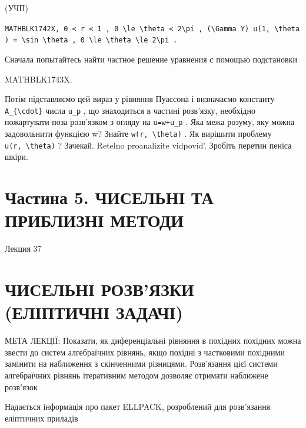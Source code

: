 \documentclass[
  ukrainian,
]{article}
\begin{document}
(УЧП)

\texttt{MATHBLK1742X,\ \textquotesingle{}0\ \textless{}\ r\ \textless{}\ 1\textquotesingle{}\ ,\ \textquotesingle{}0\ \textbackslash{}le\ \textbackslash{}theta\ \textless{}\ 2\textbackslash{}pi\textquotesingle{}\ ,\ \textquotesingle{}(\textbackslash{}Gamma\ Y)\textquotesingle{}\ \textquotesingle{}u(1,\ \textbackslash{}theta)\ =\ \textbackslash{}sin\ \textbackslash{}theta\textquotesingle{}\ ,\ \textquotesingle{}0\ \textbackslash{}le\ \textbackslash{}theta\ \textbackslash{}le\ 2\textbackslash{}pi\textquotesingle{}\ .}

Сначала попытайтесь найти частное решение уравнения с помощью
подстановки

MATHBLK1743X.

Потім підставляємо цей вираз у рівняння Пуассона і визначаємо константу
\texttt{A\_\{\textbackslash{}cdot\}} числа \texttt{u\_p} , що
знаходиться в частині розв'язку, необхідно пожартувати поза розв'язком з
огляду на \texttt{u=w+u\_p} . Яка межа розуму, яку можна задовольнити
функцією w? Знайте \texttt{w(r,\ \textbackslash{}theta)} . Як вирішити
проблему \texttt{u(r,\ \textbackslash{}theta)} ? Зачекай. Retelno
proanalizite vidpovid'. Зробіть перетин пеніса шкіри.

\section{Частина 5. ЧИСЕЛЬНІ ТА ПРИБЛИЗНІ
МЕТОДИ}\label{ux447ux430ux441ux442ux438ux43dux430-5.-ux447ux438ux441ux435ux43bux44cux43dux456-ux442ux430-ux43fux440ux438ux431ux43bux438ux437ux43dux456-ux43cux435ux442ux43eux434ux438}

Лекция 37

\section{ЧИСЕЛЬНІ РОЗВ'ЯЗКИ (ЕЛІПТИЧНІ
ЗАДАЧІ)}\label{ux447ux438ux441ux435ux43bux44cux43dux456-ux440ux43eux437ux432ux44fux437ux43aux438-ux435ux43bux456ux43fux442ux438ux447ux43dux456-ux437ux430ux434ux430ux447ux456}

МЕТА ЛЕКЦІЇ: Показати, як диференціальні рівняння в похідних похідних
можна звести до систем алгебраїчних рівнянь, якщо похідні з частковими
похідними замінити на наближення з скінченними різницями. Розв'язання
цієї системи алгебраїчних рівнянь ітеративним методом дозволяє отримати
наближене розв'язок

Надається інформація про пакет ELLPACK, розроблений для розв'язання
еліптичних приладів
\end{document}
